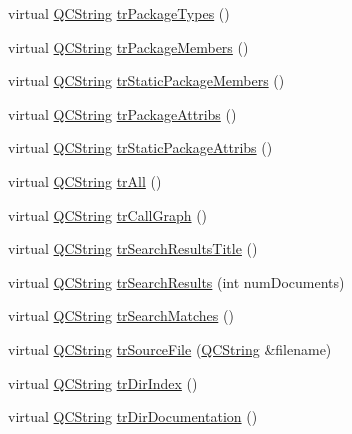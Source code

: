 \begin{DoxyCompactItemize}
\item 
virtual \hyperlink{class_q_c_string}{Q\+C\+String} \hyperlink{class_translator_greek_a380a110ec43538fef2ce37e1f1278df8}{tr\+Package\+Types} ()
\item 
virtual \hyperlink{class_q_c_string}{Q\+C\+String} \hyperlink{class_translator_greek_a56153559fad2adb2cd88617fdae401c3}{tr\+Package\+Members} ()
\item 
virtual \hyperlink{class_q_c_string}{Q\+C\+String} \hyperlink{class_translator_greek_acd1b9849300cd47ae7de1f560ef163f7}{tr\+Static\+Package\+Members} ()
\item 
virtual \hyperlink{class_q_c_string}{Q\+C\+String} \hyperlink{class_translator_greek_a16fab3dbe3a2b78ae4131630f34d5c7f}{tr\+Package\+Attribs} ()
\item 
virtual \hyperlink{class_q_c_string}{Q\+C\+String} \hyperlink{class_translator_greek_a934d1a1e2c7d425c5482109510fbd383}{tr\+Static\+Package\+Attribs} ()
\item 
virtual \hyperlink{class_q_c_string}{Q\+C\+String} \hyperlink{class_translator_greek_a5082c13f8ead248e0a2890d82b4ce2c9}{tr\+All} ()
\item 
virtual \hyperlink{class_q_c_string}{Q\+C\+String} \hyperlink{class_translator_greek_af0054eed6fe9bc9b1ce396b013510c99}{tr\+Call\+Graph} ()
\item 
virtual \hyperlink{class_q_c_string}{Q\+C\+String} \hyperlink{class_translator_greek_ad18014591c79c8e61748f7bec954a8ac}{tr\+Search\+Results\+Title} ()
\item 
virtual \hyperlink{class_q_c_string}{Q\+C\+String} \hyperlink{class_translator_greek_abaaed403a2ffb2b088276daf6984e468}{tr\+Search\+Results} (int num\+Documents)
\item 
virtual \hyperlink{class_q_c_string}{Q\+C\+String} \hyperlink{class_translator_greek_abab362105ce2f228bc767c390bb10d8d}{tr\+Search\+Matches} ()
\item 
virtual \hyperlink{class_q_c_string}{Q\+C\+String} \hyperlink{class_translator_greek_a21ef7d1e395a1a1171e172bdf0e22fd7}{tr\+Source\+File} (\hyperlink{class_q_c_string}{Q\+C\+String} \&filename)
\item 
virtual \hyperlink{class_q_c_string}{Q\+C\+String} \hyperlink{class_translator_greek_aeeb3efbd6779bb55f597401e9ad0b52e}{tr\+Dir\+Index} ()
\item 
virtual \hyperlink{class_q_c_string}{Q\+C\+String} \hyperlink{class_translator_greek_a02ec83db473704443c1f50668b5cfd27}{tr\+Dir\+Documentation} ()
\item 

\end{DoxyCompactItemize}
